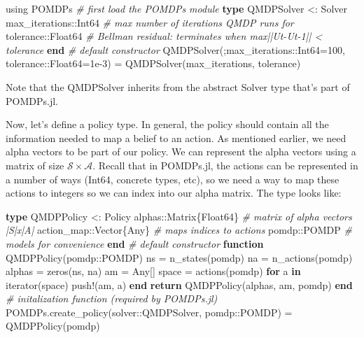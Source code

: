 \documentclass[12pt,]{article}
\newenvironment{Shaded}{}{}
\newcommand{\KeywordTok}[1]{\textcolor[rgb]{0.00,0.44,0.13}{\textbf{{#1}}}}
\newcommand{\DataTypeTok}[1]{\textcolor[rgb]{0.56,0.13,0.00}{{#1}}}
\newcommand{\FloatTok}[1]{\textcolor[rgb]{0.25,0.63,0.44}{{#1}}}
\newcommand{\CommentTok}[1]{\textcolor[rgb]{0.38,0.63,0.69}{\textit{{#1}}}}
\newcommand{\NormalTok}[1]{{#1}}
\begin{document}
\begin{Shaded}
\begin{Highlighting}[]
\NormalTok{using POMDPs }\CommentTok{# first load the POMDPs module}
\KeywordTok{type} \NormalTok{QMDPSolver <: Solver}
    \NormalTok{max_iterations::}\DataTypeTok{Int64} \CommentTok{# max number of iterations QMDP runs for}
    \NormalTok{tolerance::}\DataTypeTok{Float64} \CommentTok{# Bellman residual: terminates when max||Ut-Ut-1|| < tolerance}
\KeywordTok{end}
\CommentTok{# default constructor}
\NormalTok{QMDPSolver(;max_iterations::}\DataTypeTok{Int64}\NormalTok{=}\FloatTok{100}\NormalTok{,
tolerance::}\DataTypeTok{Float64}\NormalTok{=}\FloatTok{1e-3}\NormalTok{) =}
                                    \NormalTok{QMDPSolver(max_iterations, tolerance)}
\end{Highlighting}
\end{Shaded}

Note that the QMDPSolver inherits from the abstract Solver type that's
part of POMDPs.jl.

Now, let's define a policy type. In general, the policy should contain
all the information needed to map a belief to an action. As mentioned
earlier, we need alpha vectors to be part of our policy. We can
represent the alpha vectors using a matrix of size
\(\mathcal{S} \times \mathcal{A}\). Recall that in POMDPs.jl, the
actions can be represented in a number of ways (Int64, concrete types,
etc), so we need a way to map these actions to integers so we can index
into our alpha matrix. The type looks like:

\begin{Shaded}
\begin{Highlighting}[]
\KeywordTok{type} \NormalTok{QMDPPolicy <: Policy}
    \NormalTok{alphas::}\DataTypeTok{Matrix}\NormalTok{\{}\DataTypeTok{Float64}\NormalTok{\} }\CommentTok{# matrix of alpha vectors |S|x|A|}
    \NormalTok{action_map::}\DataTypeTok{Vector}\NormalTok{\{}\DataTypeTok{Any}\NormalTok{\} }\CommentTok{# maps indices to actions}
    \NormalTok{pomdp::POMDP            }\CommentTok{# models for convenience}
\KeywordTok{end}
\CommentTok{# default constructor}
\KeywordTok{function} \NormalTok{QMDPPolicy(pomdp::POMDP)}
    \NormalTok{ns = n_states(pomdp)}
    \NormalTok{na = n_actions(pomdp)}
    \NormalTok{alphas = zeros(ns, na)}
    \NormalTok{am = }\DataTypeTok{Any}\NormalTok{[]}
    \NormalTok{space = actions(pomdp)}
    \KeywordTok{for} \NormalTok{a }\KeywordTok{in} \NormalTok{iterator(space)}
        \NormalTok{push!(am, a)}
    \KeywordTok{end}
    \KeywordTok{return} \NormalTok{QMDPPolicy(alphas, am, pomdp)}
\KeywordTok{end}
\CommentTok{# initalization function (required by POMDPs.jl)}
\NormalTok{POMDPs.create_policy(solver::QMDPSolver, pomdp::POMDP) = QMDPPolicy(pomdp)}
\end{Highlighting}
\end{Shaded}
\end{document}
